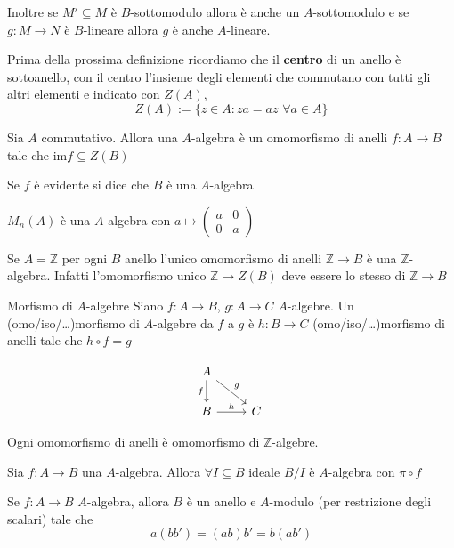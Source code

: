 Inoltre se \(M' \subseteq M \) è \(B\)-sottomodulo allora è anche un
\(A\)-sottomodulo e se \(g : M \to N\) è \(B\)-lineare allora \(g\) è anche \(A\)-lineare.


Prima della prossima definizione ricordiamo che il \textbf{centro} di un anello
è sottoanello, con il centro l'insieme degli elementi che commutano con tutti
gli altri elementi e indicato con \(Z{(A)}\),
\[
  Z{(A)} := \{z \in A : za = az \,\,\forall a \in A\} 
\]
\begin{definition}{}
    Sia \(A\) commutativo. Allora una \(A\)-algebra è un omomorfismo di anelli
    \(f:A\to B\) tale che \(\mathrm{im}f \subseteq Z{(B)}\) 
\end{definition}
Se \(f\) è evidente si dice che \(B\) è una \(A\)-algebra
\begin{example}{}
    \(M_n{(A)}\) è una \(A\)-algebra con \(a \mapsto \begin{pmatrix}
        
        a & 0 \\
        0 & a
    \end{pmatrix}\) 
\end{example}

\begin{example}{}
    Se \(A = \mathbb{Z}\) per ogni \(B\) anello l'unico omomorfismo di anelli \(\mathbb{Z}\to B\) è una \(\mathbb{Z}\)-algebra. Infatti l'omomorfismo unico \(\mathbb{Z} \to Z{(B)}\) deve essere lo stesso di \(\mathbb{Z} \to B\) 
\end{example}

\begin{definition}{Morfismo di \(A\)-algebre}
    Siano \(f : A\to B\), \(g : A\to C\) \(A\)-algebre. Un (omo/iso/\dots)morfismo di
    \(A\)-algebre da \(f\) a \(g\) è \(h : B\to C\) (omo/iso/\dots)morfismo di anelli tale
    che \(h \circ f = g\) 
\end{definition}
\[\begin{tikzcd}
	A \\
    B & C
    \arrow["{f}"', from=1-1, to=2-1]
	\arrow["{g}", from=1-1, to=2-2]
    \arrow["{h}", from=2-1, to=2-2]
\end{tikzcd}\]

\begin{example}{}
    Ogni omomorfismo di anelli è omomorfismo di \(\mathbb{Z}\)-algebre. 
\end{example}
\begin{example}{}
    Sia \(f : A\to B\) una \(A\)-algebra. Allora \(\forall I \subseteq B \) ideale \(B / I\) è \(A\)-algebra con \(\pi \circ f\) 
\end{example}


\begin{remark}
    Se \(f : A\to B\) \(A\)-algebra, allora \(B\) è un anello e \(A\)-modulo
    (per restrizione degli scalari) tale che 
    \[
      a{(b b')} = {(ab)}b' = b{(ab')}
    \]
\end{remark}


